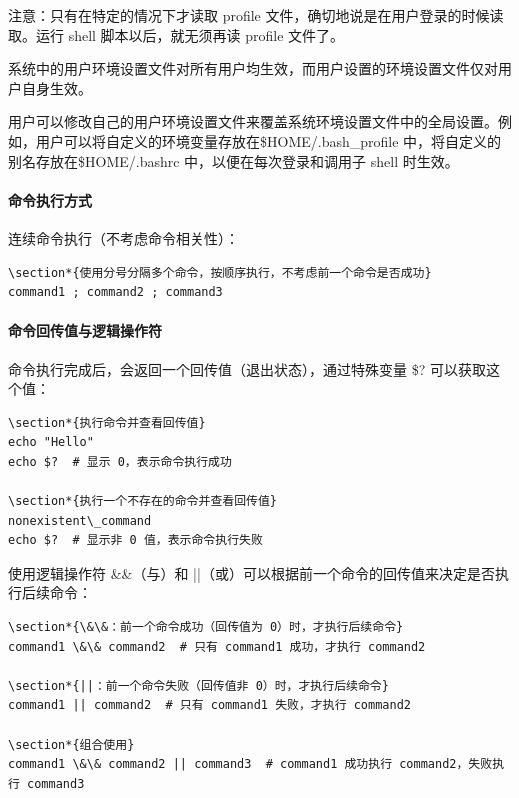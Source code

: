 \documentclass[12pt,UTF8]{ctexbook}
\begin{document}
注意：只有在特定的情况下才读取 profile 文件，确切地说是在用户登录的时候读取。运行 shell 脚本以后，就无须再读 profile 文件了。

系统中的用户环境设置文件对所有用户均生效，而用户设置的环境设置文件仅对用户自身生效。

用户可以修改自己的用户环境设置文件来覆盖系统环境设置文件中的全局设置。例如，用户可以将自定义的环境变量存放在\$HOME/.bash_profile 中，将自定义的别名存放在\$HOME/.bashrc 中，以便在每次登录和调用子 shell 时生效。

\paragraph{命令执行方式}

连续命令执行（不考虑命令相关性）：
\begin{verbatim}
\section*{使用分号分隔多个命令，按顺序执行，不考虑前一个命令是否成功}
command1 ; command2 ; command3
\end{verbatim}

\paragraph{命令回传值与逻辑操作符}

命令执行完成后，会返回一个回传值（退出状态），通过特殊变量 \$? 可以获取这个值：
\begin{verbatim}
\section*{执行命令并查看回传值}
echo "Hello"
echo $?  # 显示 0，表示命令执行成功

\section*{执行一个不存在的命令并查看回传值}
nonexistent\_command
echo $?  # 显示非 0 值，表示命令执行失败
\end{verbatim}

使用逻辑操作符 \&\&（与）和 ||（或）可以根据前一个命令的回传值来决定是否执行后续命令：
\begin{verbatim}
\section*{\&\&：前一个命令成功（回传值为 0）时，才执行后续命令}
command1 \&\& command2  # 只有 command1 成功，才执行 command2

\section*{||：前一个命令失败（回传值非 0）时，才执行后续命令}
command1 || command2  # 只有 command1 失败，才执行 command2

\section*{组合使用}
command1 \&\& command2 || command3  # command1 成功执行 command2，失败执行 command3
\end{verbatim}
\end{document}
